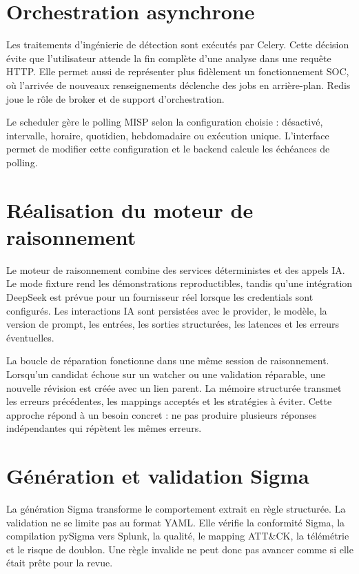 \section{Orchestration asynchrone}

Les traitements d'ingénierie de détection sont exécutés par Celery. Cette décision évite que l'utilisateur attende la fin complète d'une analyse dans une requête HTTP. Elle permet aussi de représenter plus fidèlement un fonctionnement SOC, où l'arrivée de nouveaux renseignements déclenche des jobs en arrière-plan. Redis joue le rôle de broker et de support d'orchestration.

Le scheduler gère le polling MISP selon la configuration choisie : désactivé, intervalle, horaire, quotidien, hebdomadaire ou exécution unique. L'interface permet de modifier cette configuration et le backend calcule les échéances de polling.

\section{Réalisation du moteur de raisonnement}

Le moteur de raisonnement combine des services déterministes et des appels IA. Le mode fixture rend les démonstrations reproductibles, tandis qu'une intégration DeepSeek est prévue pour un fournisseur réel lorsque les credentials sont configurés. Les interactions IA sont persistées avec le provider, le modèle, la version de prompt, les entrées, les sorties structurées, les latences et les erreurs éventuelles.

La boucle de réparation fonctionne dans une même session de raisonnement. Lorsqu'un candidat échoue sur un watcher ou une validation réparable, une nouvelle révision est créée avec un lien parent. La mémoire structurée transmet les erreurs précédentes, les mappings acceptés et les stratégies à éviter. Cette approche répond à un besoin concret : ne pas produire plusieurs réponses indépendantes qui répètent les mêmes erreurs.

\section{Génération et validation Sigma}

La génération Sigma transforme le comportement extrait en règle structurée. La validation ne se limite pas au format YAML. Elle vérifie la conformité Sigma, la compilation pySigma vers Splunk, la qualité, le mapping ATT\&CK, la télémétrie et le risque de doublon. Une règle invalide ne peut donc pas avancer comme si elle était prête pour la revue.

